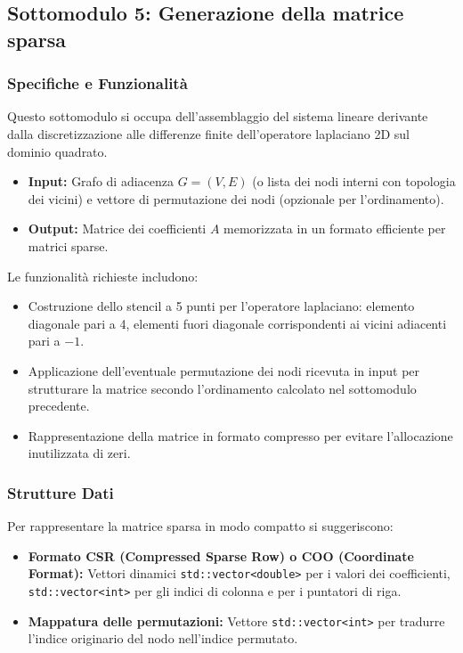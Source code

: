 \documentclass[twocolumn]{article}
\begin{document}
\subsection{Sottomodulo 5: Generazione della matrice sparsa}

\subsubsection{Specifiche e Funzionalit\`a}
Questo sottomodulo si occupa dell'assemblaggio del sistema lineare derivante dalla discretizzazione alle differenze finite dell'operatore laplaciano 2D sul dominio quadrato.
\begin{itemize}
    \item \textbf{Input:} Grafo di adiacenza $G=(V, E)$ (o lista dei nodi interni con topologia dei vicini) e vettore di permutazione dei nodi (opzionale per l'ordinamento).
    \item \textbf{Output:} Matrice dei coefficienti $A$ memorizzata in un formato efficiente per matrici sparse.
\end{itemize}

Le funzionalit\`a richieste includono:
\begin{itemize}
    \item Costruzione dello stencil a 5 punti per l'operatore laplaciano: elemento diagonale pari a 4, elementi fuori diagonale corrispondenti ai vicini adiacenti pari a $-1$.
    \item Applicazione dell'eventuale permutazione dei nodi ricevuta in input per strutturare la matrice secondo l'ordinamento calcolato nel sottomodulo precedente.
    \item Rappresentazione della matrice in formato compresso per evitare l'allocazione inutilizzata di zeri.
\end{itemize}

\subsubsection{Strutture Dati}
Per rappresentare la matrice sparsa in modo compatto si suggeriscono:
\begin{itemize}
    \item \textbf{Formato CSR (Compressed Sparse Row) o COO (Coordinate Format):} Vettori dinamici \texttt{std::vector<double>} per i valori dei coefficienti, \texttt{std::vector<int>} per gli indici di colonna e per i puntatori di riga.
    \item \textbf{Mappatura delle permutazioni:} Vettore \texttt{std::vector<int>} per tradurre l'indice originario del nodo nell'indice permutato.
\end{itemize}
\end{document}
